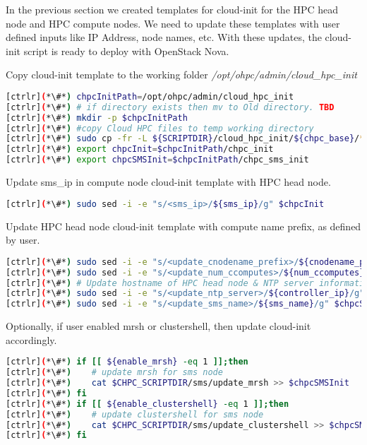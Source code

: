 	In the previous section we created templates for cloud-init for the HPC head node and HPC compute nodes. We need to update these templates with user defined inputs like IP Address, node names, etc. With these updates, the cloud-init script is ready to deploy with OpenStack Nova.

	Copy cloud-init template to the working folder {\em /opt/ohpc/admin/cloud\_hpc\_init }


\begin{lstlisting}[language=bash,keywords={}]
[ctrlr](*\#*) chpcInitPath=/opt/ohpc/admin/cloud_hpc_init
[ctrlr](*\#*) # if directory exists then mv to Old directory. TBD
[ctrlr](*\#*) mkdir -p $chpcInitPath
[ctrlr](*\#*) #copy Cloud HPC files to temp working directory
[ctrlr](*\#*) sudo cp -fr -L ${SCRIPTDIR}/cloud_hpc_init/${chpc_base}/* $chpcInitPath
[ctrlr](*\#*) export chpcInit=$chpcInitPath/chpc_init
[ctrlr](*\#*) export chpcSMSInit=$chpcInitPath/chpc_sms_init
\end{lstlisting}

	Update sms\_ip in compute node cloud-init template with HPC head node. 
	
\begin{lstlisting}[language=bash,keywords={}]
[ctrlr](*\#*) sudo sed -i -e "s/<sms_ip>/${sms_ip}/g" $chpcInit
\end{lstlisting}

	Update HPC head node cloud-init template with compute name prefix, as defined by user.

\begin{lstlisting}[language=bash,keywords={}]
[ctrlr](*\#*) sudo sed -i -e "s/<update_cnodename_prefix>/${cnodename_prefix}/g" $chpcSMSInit
[ctrlr](*\#*) sudo sed -i -e "s/<update_num_ccomputes>/${num_ccomputes}/g" $chpcSMSInit
[ctrlr](*\#*) # Update hostname of HPC head node & NTP server information
[ctrlr](*\#*) sudo sed -i -e "s/<update_ntp_server>/${controller_ip}/g" $chpcSMSInit
[ctrlr](*\#*) sudo sed -i -e "s/<update_sms_name>/${sms_name}/g" $chpcSMSInit
\end{lstlisting}

	Optionally, if user enabled mrsh or clustershell, then update cloud-init accordingly.

\begin{lstlisting}[language=bash,keywords={}]
[ctrlr](*\#*) if [[ ${enable_mrsh} -eq 1 ]];then
[ctrlr](*\#*)    # update mrsh for sms node
[ctrlr](*\#*)    cat $CHPC_SCRIPTDIR/sms/update_mrsh >> $chpcSMSInit
[ctrlr](*\#*) fi
[ctrlr](*\#*) if [[ ${enable_clustershell} -eq 1 ]];then
[ctrlr](*\#*)    # update clustershell for sms node
[ctrlr](*\#*)    cat $CHPC_SCRIPTDIR/sms/update_clustershell >> $chpcSMSInit
[ctrlr](*\#*) fi
\end{lstlisting}
